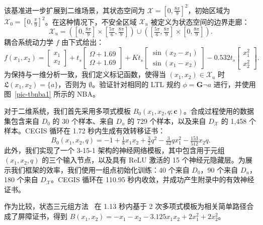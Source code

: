 该基准进一步扩展到二维场景，其状态空间为 $\mathcal{X} = [0, \frac{8\pi}{9}]^2$，初始区域为 $\mathcal{X}_0 = [0, \frac{\pi}{9}]^2$。在这种情况下，不安全区域 $\mathcal{X}_u$ 被定义为状态空间的边界走廊：
\begin{equation}
\mathcal{X}_u = \left([0, \tfrac{8\pi}{9}] \times [\tfrac{5\pi}{6}, \tfrac{8\pi}{9}]\right) \cup \left([\tfrac{5\pi}{6}, \tfrac{8\pi}{9}] \times [0, \tfrac{8\pi}{9}]\right).
\end{equation}
耦合系统动力学 $f$ 由下式给出：
\begin{equation}
f(x_1, x_2) =
\begin{bmatrix} x_1 \\ x_2 \end{bmatrix}
+ t_s
\begin{bmatrix} \Omega + 1.69 \\ \Omega + 1.69 \end{bmatrix}
+ K t_s
\begin{bmatrix} \sin(x_2 - x_1) \\ \sin(x_1 - x_2) \end{bmatrix}
- 0.532 t_s
\begin{bmatrix} x_1^2 \\ x_2^2 \end{bmatrix}.
\end{equation}
为保持与一维分析一致，我们定义标记函数，使得当 $(x_1, x_2) \in \mathcal{X}_u$ 时 $\mathfrak{L}(x_1, x_2) = \{a\}$，否则为 $\emptyset$。验证针对相同的 LTL 规约 $\phi = \mathbf{G}\neg a$ 进行，并使用图~\ref{pic-tbnba1} 所示的 NBA。


对于二维系统，我们首先采用多项式模板 $B_0(x_1, x_2, q; \mathbf{c})$。合成过程使用的数据集包含来自 $D_0$ 的 30 个样本、来自 $D_u$ 的 729 个样本，以及来自 $D_{\mathcal{X}}$ 的 1,458 个样本。CEGIS 循环在 1.72 秒内生成有效转移证书：
\begin{equation}
B_0(x_1, x_2, q) = -1 + \tfrac{1}{8}x_1 x_2 + \tfrac{3}{2}q^2 - \tfrac{3}{32}q x_1^2 - \tfrac{153}{512}x_2 q.
\end{equation}
此外，我们实现了一个 3-15-1 架构的神经网络模板，其中包含用于元组 $(x_1, x_2, q)$ 的三个输入节点，以及具有 ReLU 激活的 15 个神经元隐藏层。为展示我们框架的效率，我们使用一组点初始化训练：40 个来自 $D_0$，90 个来自 $D_u$，180 个来自 $D_{\mathcal{X}}$。CEGIS 循环在 110.95 秒内收敛，并成功产生附录中的有效神经证书。

作为比较，状态三元组方法~\cite{wongpiromsarn2015automata} 在 1.13 秒内基于 2 次多项式模板为相关简单路径合成了屏障证书，得到 $B(x_1,x_2)=-x_1-x_2-3.125x_1x_2+2x_1^2+2x_2^2$。

